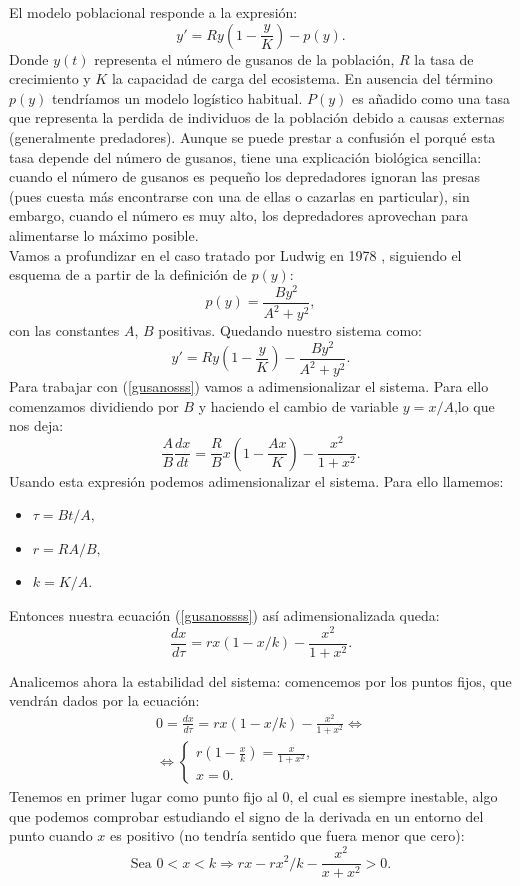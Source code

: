 El modelo poblacional responde a la expresión:
\[ y'=Ry\left( 1-\frac{y}{K}\right) -p(y). \]
Donde $y(t)$ representa el número de gusanos de la población, $R$ la tasa de crecimiento y $K$ la capacidad de carga del ecosistema. En ausencia del término $p(y)$ tendríamos un modelo logístico habitual. $P(y)$ es añadido como una tasa que representa la perdida de individuos de la población debido a causas externas (generalmente predadores). Aunque se puede prestar a confusión el porqué esta tasa depende del número de gusanos, tiene una explicación biológica sencilla: cuando el número de gusanos es pequeño los depredadores ignoran las presas (pues cuesta más encontrarse con una de ellas o cazarlas en particular), sin embargo, cuando el número es muy alto, los depredadores aprovechan para alimentarse lo máximo posible. \\
Vamos a profundizar en el caso tratado por Ludwig en 1978 \cite{ludw}, siguiendo el esquema de \cite{Strogatz} a partir de la definición de $p(y)$: 
\[p(y)=\frac{By^2}{A^2+y^2},\]
con las constantes $A$, $ B$ positivas. Quedando nuestro sistema como:
\begin{equation}
y'=Ry\left( 1-\frac{y}{K}\right) -\frac{By^2}{A^2+y^2}.
\label{gusanosss}
\end{equation} 
Para trabajar con (\ref{gusanosss}) vamos a adimensionalizar el sistema. Para ello comenzamos dividiendo por $B$ y haciendo el cambio de variable $y=x/A$,lo que nos deja:
\begin{equation}
\frac{A}{B}\frac{dx}{dt}=\frac{R}{B}x\left( 1-\frac{Ax}{K}\right) -\frac{x^2}{1+x^2}.
\label{gusanossss}
\end{equation} 
Usando esta expresión podemos adimensionalizar el sistema. Para ello llamemos:
\begin{itemize}
	\item $\tau=Bt/A,$
	\item $r=RA/B,$
	\item $k=K/A.$
\end{itemize}
Entonces nuestra ecuación (\ref{gusanossss}) así adimensionalizada queda:
\begin{equation}
\frac{dx}{d\tau}=rx(1-x/k)-\frac{x^2}{1+x^2}.
\label{gusaca}
\end{equation}

Analicemos ahora la estabilidad del sistema:
comencemos por los puntos fijos, que vendrán dados por la ecuación:
\begin{equation}
\begin{split}
0=\frac{dx}{d\tau}=rx(1-x/k)-\frac{x^2}{1+x^2}\Leftrightarrow \\\Leftrightarrow \left \{ \begin{matrix} r(1-\frac{x}{k})=\frac{x}{1+x^2},\\ x=0.\end{matrix}\right .  \label{gusaco}
\end{split}
\end{equation}
Tenemos en primer lugar como punto fijo al $0$, el cual es siempre inestable, algo que podemos comprobar estudiando el signo de la derivada en un entorno del punto cuando $x$ es positivo (no tendría sentido que fuera menor que cero):
\[\text{Sea  }  0<x<k \Rightarrow rx-rx^2/k-\frac{x^2}{x+x^2}>0.\]

